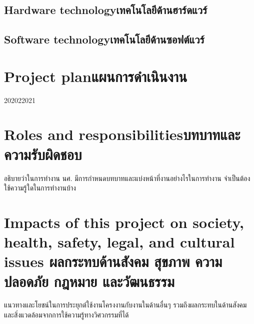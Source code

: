 \subsection{\ifenglish Hardware technology\else เทคโนโลยีด้านฮาร์ดแวร์\fi}

\subsection{\ifenglish Software technology\else เทคโนโลยีด้านซอฟต์แวร์\fi}

\section{\ifenglish Project plan\else แผนการดำเนินงาน\fi}

\begin{plan}{6}{2020}{2}{2021}
\end{plan}

\section{\ifenglish Roles and responsibilities\else บทบาทและความรับผิดชอบ\fi}
อธิบายว่าในการทำงาน นศ. มีการกำหนดบทบาทและแบ่งหน้าที่งานอย่างไรในการทำงาน จำเป็นต้องใช้ความรู้ใดในการทำงานบ้าง

\section{\ifenglish%
Impacts of this project on society, health, safety, legal, and cultural issues
\else%
ผลกระทบด้านสังคม สุขภาพ ความปลอดภัย กฎหมาย และวัฒนธรรม
\fi}

แนวทางและโยชน์ในการประยุกต์ใช้งานโครงงานกับงานในด้านอื่นๆ รวมถึงผลกระทบในด้านสังคมและสิ่งแวดล้อมจากการใช้ความรู้ทางวิศวกรรมที่ได้
